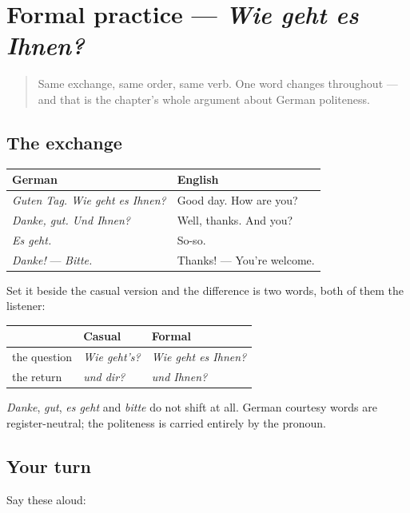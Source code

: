 \section[Practice]{Formal practice — \emph{Wie geht es Ihnen?}}

\label{lesson:GE-C03-formal-practice}



\begin{quote}
Same exchange, same order, same verb. One word changes throughout — and that is the chapter's whole argument about German politeness.
\end{quote}

\subsection*{The exchange}
\noindent
\begin{tabularx}{\linewidth}{@{}>{\raggedright\arraybackslash}X>{\raggedright\arraybackslash}X@{}}
\toprule
\textbf{German} & \textbf{English} \\
\midrule
\emph{Guten Tag. Wie geht es Ihnen?} & Good day. How are you? \\
\emph{Danke, gut. Und Ihnen?} & Well, thanks. And you? \\
\emph{Es geht.} & So-so. \\
\emph{Danke!} — \emph{Bitte.} & Thanks! — You're welcome. \\
\bottomrule
\end{tabularx}

Set it beside the casual version and the difference is two words, both of them the listener:

\noindent
\begin{tabularx}{\linewidth}{@{}>{\raggedright\arraybackslash}X>{\raggedright\arraybackslash}X>{\raggedright\arraybackslash}X@{}}
\toprule
\textbf{} & \textbf{Casual} & \textbf{Formal} \\
\midrule
the question & \emph{Wie geht's?} & \emph{Wie geht es Ihnen?} \\
the return & \emph{und dir?} & \emph{und Ihnen?} \\
\bottomrule
\end{tabularx}

\emph{Danke}, \emph{gut}, \emph{es geht} and \emph{bitte} do not shift at all. German courtesy words are register-neutral; the politeness is carried entirely by the pronoun.

\subsection*{Your turn}
Say these aloud:

